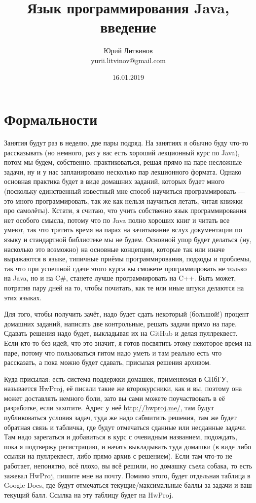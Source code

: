 \documentclass[a5paper]{article}
\title{Язык программирования Java, введение}
\author{Юрий Литвинов\\\small{yurii.litvinov@gmail.com}}
\date{16.01.2019}
\begin{document}
\maketitle
\thispagestyle{empty}

\section{Формальности}

Занятия будут раз в неделю, две пары подряд. На занятиях я обычно буду что-то рассказывать (но немного, раз у вас есть хороший лекционный курс по Java), потом мы будем, собственно, практиковаться, решая прямо на паре несложные задачи, ну и у нас запланировано несколько пар лекционного формата. Однако основная практика будет в виде домашних заданий, которых будет много (поскольку единственный известный мне способ научиться программировать --- это много программировать, так же как нельзя научиться летать, читая книжки про самолёты). Кстати, я считаю, что учить собственно язык программирования нет особого смысла, потому что по Java полно хороших книг и читать все умеют, так что тратить время на парах на зачитывание вслух документации по языку и стандартной библиотеке мы не будем. Основной упор будет делаться (ну, насколько это возможно) на основные концепции, которые так или иначе выражаются в языке, типичные приёмы программирования, подходы и проблемы, так что при успешной сдаче этого курса вы сможете программировать не только на Java, но и на C\#, станете лучше программировать на C++. Быть может, потратив пару дней на то, чтобы почитать, как те или иные штуки делаются на этих языках.

Для того, чтобы получить зачёт, надо будет сдать некоторый (большой!) процент домашних заданий, написать две контрольные, решать задачи прямо на паре. Сдавать решения надо будет, выкладывая их на GitHub и делая пуллреквест. Если кто-то без идей, что это значит, я готов посвятить этому некоторое время на паре, потому что пользоваться гитом надо уметь и там реально есть что рассказать, а пока можно будет сдавать, присылая решения архивом. 

Куда присылая: есть система поддержки домашек, применяемая в СПбГУ, называется HwProj, её писали такие же второкурсники, как и вы, поэтому она может доставлять немного боли, зато вы сами можете поучаствовать в её разработке, если захотите. Адрес у неё \url{http://hwproj.me/}, там будут публиковаться условия задач, туда же надо сабмитить решения, там же будет обратная связь и табличка, где будут отмечаться сданные или несданные задачи. Там надо зарегаться и добавиться в курс с очевидным названием, подождать, пока я подтвержу регистрацию, и начать выкладывать туда домашки (в виде либо ссылки на пуллреквест, либо прямо архив с решением). Если там что-то не работает, непонятно, всё плохо, вы всё решили, но домашку съела собака, то есть зажевал HwProj, пишите мне на почту. Помимо этого, будет отдельная таблица в Google Docs, где будут отмечаться текущие/максимальные баллы за задачи и ваш текущий балл. Ссылка на эту таблицу будет на HwProj.
\end{document}
